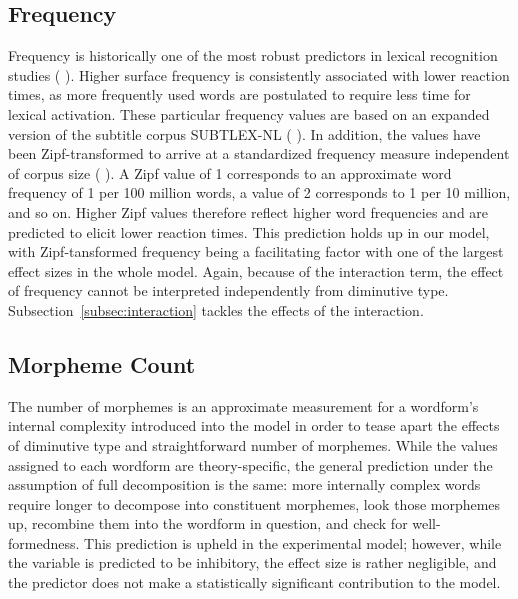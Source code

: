 \subsection{Frequency} \label{subsec:freq}
Frequency is historically one of the most robust predictors in lexical recognition studies (\citeauthor{Brysbaert+etal+2016} \citeyear{Brysbaert+etal+2016}). Higher surface frequency is consistently associated with lower reaction times, as more frequently used words are postulated to require less time for lexical activation. These particular frequency values are based on an expanded version of the subtitle corpus SUBTLEX-NL (\citeauthor{Keuleers+etal+2010a} \citeyear{Keuleers+etal+2010a}). In addition, the values have been Zipf-transformed to arrive at a standardized frequency measure independent of corpus size (\citeauthor{vanHeuven+etal+2014} \citeyear{vanHeuven+etal+2014}). A Zipf value of 1 corresponds to an approximate word frequency of 1 per 100 million words, a value of 2 corresponds to 1 per 10 million, and so on. Higher Zipf values therefore reflect higher word frequencies and are predicted to elicit lower reaction times. This prediction holds up in our model, with Zipf-tansformed frequency being a facilitating factor with one of the largest effect sizes in the whole model. Again, because of the interaction term, the effect of frequency cannot be interpreted independently from diminutive type. Subsection~\ref{subsec:interaction} tackles the effects of the interaction.
\subsection{Morpheme Count} \label{subsec:nmorph}
The number of morphemes is an approximate measurement for a wordform's internal complexity introduced into the model in order to tease apart the effects of diminutive type and straightforward number of morphemes. While the values assigned to each wordform are theory-specific, the general prediction under the assumption of full decomposition is the same: more internally complex words require longer to decompose into constituent morphemes, look those morphemes up, recombine them into the wordform in question, and check for well-formedness. This prediction is upheld in the experimental model; however, while the variable is predicted to be inhibitory, the effect size is rather negligible, and the predictor does not make a statistically significant contribution to the model.
